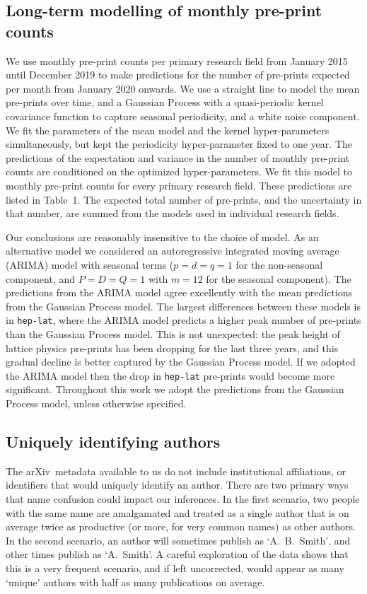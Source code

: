 \documentclass[a4paper,12pt]{article}
\newcommand{\arxiv}{arXiv}
\begin{document}
\subsection*{Long-term modelling of monthly pre-print counts}

We use monthly pre-print counts per primary research field from January 2015 until December 2019 to make predictions for the number of pre-prints expected per month from January 2020 onwards. We use a straight line to model the mean pre-prints over time, and a Gaussian Process with a quasi-periodic kernel covariance function to capture seasonal periodicity\cite{Rasmussen:2006,Ambikasaran:2014}, and a white noise component. We fit the parameters of the mean model and the kernel hyper-parameters simultaneously, but kept the periodicity hyper-parameter fixed to one year. The predictions of the expectation and variance in the number of monthly pre-print counts are conditioned on the optimized hyper-parameters. We fit this model to monthly pre-print counts for every primary research field. These predictions are listed in Table~1. The expected total number of pre-prints, and the uncertainty in that number, are summed from the models used in individual research fields.

Our conclusions are reasonably insensitive to the choice of model. As an alternative model we considered an autoregressive integrated moving average (ARIMA) model\cite{BoxJenkins:1970} with seasonal terms ($p=d=q=1$ for the non-seasonal component, and $P=D=Q=1$ with $m=12$ for the seasonal component). The predictions from the ARIMA model agree excellently with the mean predictions from the Gaussian Process model. The largest differences between these models is in \texttt{hep-lat}, where the ARIMA model predicts a higher peak number of pre-prints than the Gaussian Process model. This is not unexpected: the peak height of lattice physics pre-prints has been dropping for the last three years, and this gradual decline is better captured by the Gaussian Process model. If we adopted the ARIMA model then the drop in \texttt{hep-lat} pre-prints would become more significant. Throughout this work we adopt the predictions from the Gaussian Process model, unless otherwise specified.


\subsection*{Uniquely identifying authors}

The \arxiv\ metadata available to us do not include institutional affiliations, or identifiers that would uniquely identify an author. 
There are two primary ways that name confusion could impact our inferences. In the first scenario, two people with the same name are amalgamated and treated as a single author that is on average twice as productive (or more, for very common names) as other authors. In the second scenario, an author will sometimes publish as `A.~B.~Smith', and other times publish as `A.~Smith'. A careful exploration of the data shows that this is a very frequent scenario, and if left uncorrected, would appear as many `unique' authors with half as many publications on average.
\end{document}
